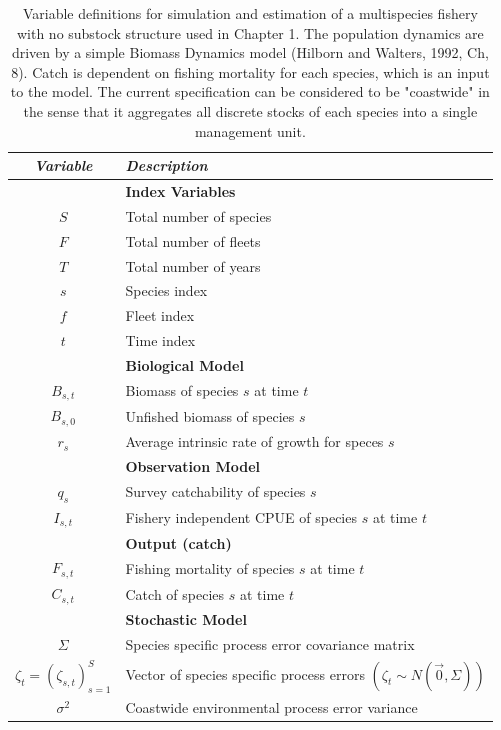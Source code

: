 \documentclass[]{scrartcl}
\begin{document}
\newpage

\begin{table}[htbp]
\begin{center}
\caption{Variable definitions for simulation and estimation of a multispecies fishery with no substock structure used in Chapter 1. The population dynamics are driven by a simple Biomass Dynamics model (Hilborn and Walters, 1992, Ch, 8). Catch is dependent on fishing mortality for each species, which is an input to the model. The current specification can be considered to be "coastwide" in the sense that it aggregates all discrete stocks of each species into a single management unit.}\label{tab:Ch1spec}
\begin{tabular}{c|l}
\textit{Variable} & \textit{Description}  \\
\hline
& \textbf{ Index Variables} \\
\hline
$S$ & Total number of species \\
$F$ & Total number of fleets \\
$T$ & Total number of years \\
$s$ & Species index \\
$f$ & Fleet index \\
$t$ & Time index \\
\hline
& \textbf{ Biological Model} \\
\hline
$B_{s,t}$ & Biomass of species $s$ at time $t$ \\
$B_{s,0}$ & Unfished biomass of species $s$ \\
$r_{s}$ & Average intrinsic rate of growth for speces $s$ \\
\hline
& \textbf{ Observation Model} \\
\hline
$q_{s}$ & Survey catchability of species $s$ \\
$I_{s,t}$ & Fishery independent CPUE of species $s$ at time $t$ \\
\hline
& \textbf{ Output (catch) } \\
\hline
$F_{s,t}$ & Fishing mortality of species $s$ at time $t$ \\
$C_{s,t}$ & Catch of species $s$ at time $t$ \\
\hline
& \textbf{ Stochastic Model} \\
\hline
$\Sigma$ & Species specific process error covariance matrix  \\
$\zeta_t = \left(\zeta_{s,t}\right)_{s=1}^S$ & Vector of species specific process errors $\left(\zeta_t \sim N ( \vec{0}, \Sigma)\right)$  \\
$\sigma^2$ & Coastwide environmental process error variance \\

\end{tabular}
\end{center}
\end{table}
\end{document}
